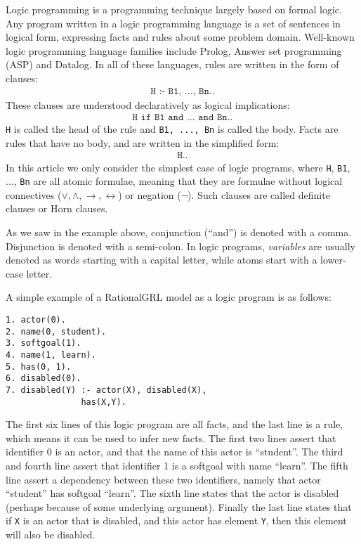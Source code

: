 Logic programming is a programming technique largely based on formal logic. Any program written in a logic programming language is a set of sentences in logical form, expressing facts and rules about some problem domain. Well-known logic programming language families include Prolog, Answer set programming (ASP) and Datalog. In all of these languages, rules are written in the form of clauses:
\begin{align*}
\texttt{H :- B1, ..., Bn.}.
\end{align*}
These clauses are understood declaratively as logical implications:
\begin{align*}
\texttt{H if B1 and ... and Bn.}.
\end{align*}
\texttt{H} is called the head of the rule and \texttt{B1, ..., Bn} is called the body. Facts are rules that have no body, and are written in the simplified form:
\begin{align}
\texttt{H.}.
\end{align}
In this article we only consider the simplest case of logic programs, where \texttt{H}, \texttt{B1}, ..., \texttt{Bn} are all atomic formulae, meaning that they are formulae without logical connectives ($\vee, \wedge, \rightarrow, \leftrightarrow$) or negation ($\neg$). Such clauses are called definite clauses or Horn clauses. 

As we saw in the example above, conjunction (``and'') is denoted with a comma. Disjunction is denoted with a semi-colon. In logic programs, \emph{variables} are usually denoted as words starting with a capital letter, while atoms start with a lower-case letter.

A simple example of a RationalGRL model as a logic program is as follows:

\begin{verbatim}
1. actor(0).
2. name(0, student).
3. softgoal(1).
4. name(1, learn).
5. has(0, 1).
6. disabled(0).
7. disabled(Y) :- actor(X), disabled(X), 
               has(X,Y).
\end{verbatim}

The first six lines of this logic program are all facts, and the last line is a rule, which means it can be used to infer new facts. The first two lines assert that identifier 0 is an actor, and that the name of this actor is ``student''. The third and fourth line assert that identifier 1 is a softgoal with name ``learn''. The fifth line assert a dependency between these two identifiers, namely that actor ``student'' has softgoal ``learn''. The sixth line states that the actor is disabled (perhaps because of some underlying argument). Finally the last line states that if \texttt{X} is an actor that is disabled, and this actor has element \texttt{Y}, then this element will also be disabled. 

